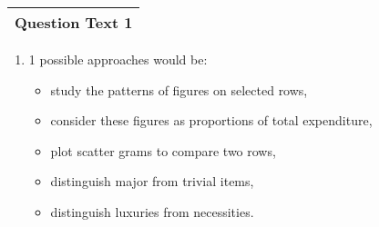 \documentclass[a4paper,12pt]{article}
\begin{document}
  \begin{table}[ht!]
     \centering
     \begin{tabular}{|p{15cm}|}
     \hline        
Question Text 1
\\ \hline
      \end{tabular}
    \end{table}
    



\begin{enumerate}
    \item 1 possible approaches would be:
\begin{itemize}
\item study the patterns of figures on selected rows,
\item consider these figures as proportions of total expenditure,
\item plot scatter grams to compare two rows,
\item distinguish major from trivial items,
\item distinguish luxuries from necessities.
\end{itemize}


\end{enumerate}
\end{document}
